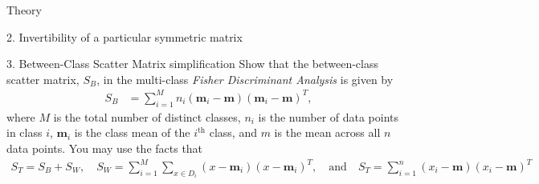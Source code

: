 \begin{section}{Theory}
\begin{homeworkSection}{2. Invertibility of a particular symmetric matrix}
\end{homeworkSection}

\begin{homeworkSection}{3. Between-Class Scatter Matrix simplification}
Show that the between-class scatter matrix, $S_B$, in the multi-class \textit{Fisher Discriminant Analysis} is given by
\begin{align*}
	S_B &= \sum_{i=1}^M n_i (\bm{m}_i - \bm{m})(\bm{m}_i - \bm{m})^T,
\end{align*}
where $M$ is the total number of distinct classes, $n_i$ is the number of data points in class $i$, $\bm{m}_i$ is the class mean of the $i^{\text{th}}$ class, and $m$ is the mean across all $n$ data points. You may use the facts that
\begin{align*}
	S_T = S_B + S_W, \quad S_W = \sum_{i=1}^M \sum_{x \in D_i} (x - \bm{m}_i)(x - \bm{m}_i)^T, \quad \text{and} \quad S_T = \sum_{i=1}^n (x_i - \bm{m})(x_i - \bm{m})^T
\end{align*}
\\
\\
\end{homeworkSection}
\end{section}
